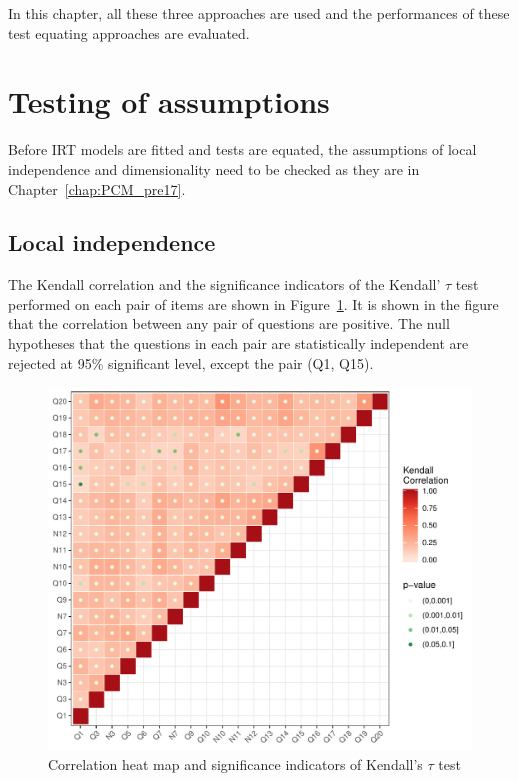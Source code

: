 \documentclass[a4paper]{report}
\begin{document}
In this chapter, all these three approaches are used and the performances of these test equating approaches are evaluated. 

\section{Testing of assumptions}

Before IRT models are fitted and tests are equated, the assumptions of local independence and dimensionality need to be checked as they are in Chapter~\ref{chap:PCM_pre17}. 

\subsection{Local independence}

The Kendall correlation and the significance indicators of the Kendall' $\tau$ test performed on each pair of items are shown in Figure~\ref{fig:IMPRV_cor_17}. It is shown in the figure that the correlation between any pair of questions are positive. The null hypotheses that the questions in each pair are statistically independent are rejected at 95\% significant level, except the pair (Q1, Q15). 

\begin{figure}[H]
  \centering
  \includegraphics[width=\linewidth]{fig/IMPRV_cor_17.pdf}
  \caption{\label{fig:IMPRV_cor_17}Correlation heat map and significance indicators of Kendall's $\tau$ test}
\end{figure}
\end{document}
